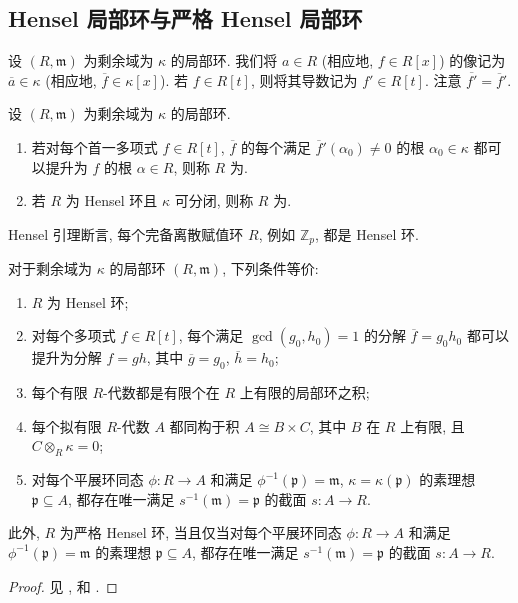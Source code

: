 \subsection{Hensel 局部环与严格 Hensel 局部环}\label{src:B.5.2-subsection}
设 $(R,\mathfrak m)$ 为剩余域为 $\kappa$ 的局部环. 我们将 $a\in R$ (相应地, $f\in R[x]$) 的像记为 $\overline a\in\kappa$ (相应地, $\overline f\in\kappa[x]$). 若 $f\in R[t]$, 则将其导数记为 $f'\in R[t]$. 注意 $\overline{f'}=\overline f'$.
\begin{definition}\label{src:B.5.8}
设 $(R,\mathfrak m)$ 为剩余域为 $\kappa$ 的局部环.
\begin{enumerate}[(1)]
\item 若对每个首一多项式 $f\in R[t]$, $\overline f$ 的每个满足 $\overline f'(\alpha_0)\neq0$ 的根 $\alpha_0\in\kappa$ 都可以提升为 $f$ 的根 $\alpha\in R$, 则称 $R$ 为.
\item 若 $R$ 为 Hensel 环且 $\kappa$ 可分闭, 则称 $R$ 为.
\end{enumerate}
\end{definition}
Hensel 引理断言, 每个完备离散赋值环 $R$, 例如 $\mathbb Z_p$, 都是 Hensel 环.
\begin{proposition}\label{src:B.5.9}
对于剩余域为 $\kappa$ 的局部环 $(R,\mathfrak m)$, 下列条件等价:
\begin{enumerate}[(1)]
\item $R$ 为 Hensel 环;
\item 对每个多项式 $f\in R[t]$, 每个满足 $\gcd(g_0,h_0)=1$ 的分解 $\overline f=g_0h_0$ 都可以提升为分解 $f=gh$, 其中 $\overline g=g_0$, $\overline h=h_0$;
\item 每个有限 $R$-代数都是有限个在 $R$ 上有限的局部环之积;
\item 每个拟有限 $R$-代数 $A$ 都同构于积 $A\cong B\times C$, 其中 $B$ 在 $R$ 上有限, 且 $C\otimes_R\kappa=0$;
\item 对每个平展环同态 $\phi:R\to A$ 和满足 $\phi^{-1}(\mathfrak p)=\mathfrak m$, $\kappa=\kappa(\mathfrak p)$ 的素理想 $\mathfrak p\subseteq A$, 都存在唯一满足 $s^{-1}(\mathfrak m)=\mathfrak p$ 的截面 $s:A\to R$.
\end{enumerate}
此外, $R$ 为严格 Hensel 环, 当且仅当对每个平展环同态 $\phi:R\to A$ 和满足 $\phi^{-1}(\mathfrak p)=\mathfrak m$ 的素理想 $\mathfrak p\subseteq A$, 都存在唯一满足 $s^{-1}(\mathfrak m)=\mathfrak p$ 的截面 $s:A\to R$.
\end{proposition}
\begin{proof}
见 \cite[$\mathrm{IV}.18.5.11$]{EGA}, \cite[定理 $\mathrm{I}.4.2$]{Mil80} 和 \cite[Tag 04GG]{SP}.
\end{proof}
